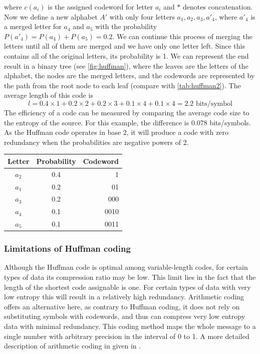       where $c(a_i)$ is the assigned codeword for letter $a_i$ and $*$ denotes concatenation. Now we define a new alphabet $A'$ with only four letters $a_1, a_2, a_3, a'_4$, where $a'_4$ is a merged letter for $a_4$ and $a_5$ with the probability $P(a'_4) = P(a_4) + P(a_5) = 0.2$. We can continue this process of merging the letters until all of them are merged and we have only one letter left. Since this contains all of the original letters, its probability is 1. We can represent the end result in a binary tree (see \autoref{fig:huffman}), where the leaves are the letters of the alphabet, the nodes are the merged letters, and the codewords are represented by the path from the root node to each leaf (compare with \autoref{tab:huffman2}). The average length of this code is
      \begin{equation}
        l = 0.4\times 1 + 0.2 \times 2 + 0.2 \times 3 + 0.1 \times 4 + 0.1 \times 4 = 2.2 \text{ bits/symbol}
      \end{equation}
      The efficiency of a code can be measured by comparing the average code size to the entropy of the source. For this example, the difference is 0.078 bits/symbols. As the Huffman code operates in base 2, it will produce a code with zero redundancy when the probabilities are negative powers of 2.
  
      \begin{table}
        \centering
        \begin{tabular}{ccr}
          \toprule
          Letter & Probability & Codeword \\
          \midrule
          $a_2$ & 0.4 & 1 \\
          $a_1$ & 0.2 & 01 \\
          $a_3$ & 0.2 & 000 \\
          $a_4$ & 0.1 & 0010 \\
          $a_5$ & 0.1 & 0011 \\
          \bottomrule
        \end{tabular}
        \label{tab:huffman2}
      \end{table}

    \subsubsection{Limitations of Huffman coding}
      Although the Huffman code is optimal among variable-length codes, for certain types of data its compression ratio may be low. This limit lies in the fact that the length of the shortest code assignable is one. For certain types of data with very low entropy this will result in a relatively high redundancy. Arithmetic coding offers an alternative here, as contrary to Huffman coding, it does not rely on substituting symbols with codewords, and thus can compress very low entropy data with minimal redundancy. This coding method maps the whole message to a single number with arbitrary precision in the interval of 0 to 1. A more detailed description of arithmetic coding in given in \cite{sayood_introduction_2012}.

